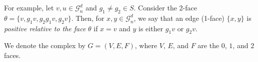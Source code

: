 \begin{example}
  For example, let $v, u \in \mathcal{G}_{n}^{d}$ and $g_{1} \neq g_{2} \in S$. Consider the 2-face $\theta = \{v, g_{1}v, g_{2}g_{1}v, g_{2}v\}$. Then, for $x, y \in \mathcal{G}_{n}^{d}$, we say that an edge (1-face) $\{x, y\}$ is \textit{positive relative to the face} $\theta$ if $x = v$ and $y$ is either $g_{1}v$ or $g_{2}v$.
\end{example}

We denote the complex by $G = (V, E, F)$, where $V$, $E$, and $F$ are the $0$, $1$, and $2$ faces.


